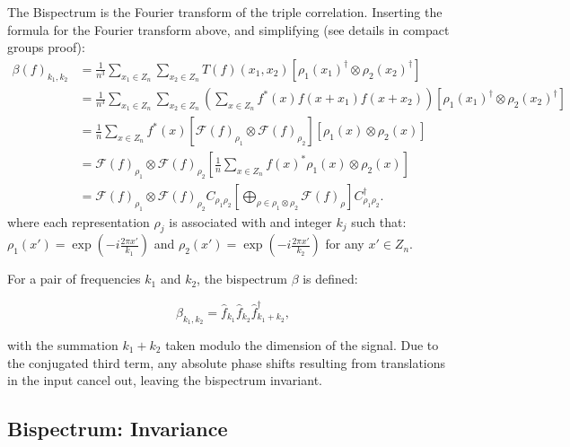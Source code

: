 \documentclass{article}
\begin{document}
The Bispectrum is the Fourier transform of the triple correlation. Inserting the formula for the Fourier transform above, and simplifying (see details in compact groups proof):
\begin{align*}
    \beta(f)_{k_1, k_2}
        &=
    \frac{1}{n^3}\sum_{x_1 \in Z_n} \sum_{x_2 \in Z_n}
    T(f)(x_1, x_2)\left[
                \rho_1(x_1)^{\dagger} \otimes \rho_2(x_2)^{\dagger}
            \right]\\
    &=
    \frac{1}{n^3}\sum_{x_1 \in Z_n} \sum_{x_2 \in Z_n}
    \left(\sum_{x \in Z_n}
       f^*(x)
       f\left(x + x_1\right) f\left(x+ x_2\right)\right)
            \left[
                \rho_1(x_1)^{\dagger} \otimes \rho_2(x_2)^{\dagger}
            \right]\\
    &= \frac{1}{n}
        \sum_{x \in Z_n} f^*(x)
            [\mathcal{F}(f)_{\rho_1} \otimes \mathcal{F}(f)_{\rho_2}]
            \left[
                \rho_1(x) \otimes \rho_2(x)
            \right]\\
    &= \mathcal{F}(f)_{\rho_1} \otimes \mathcal{F}(f)_{\rho_2}
        \left[
            \frac{1}{n}
                \sum_{x \in Z_n} f(x)^* \rho_1(x) \otimes \rho_2(x)
        \right] \\
    &=
\mathcal{F}(f)_{\rho_1} \otimes \mathcal{F}(f)_{\rho_2} C_{{\rho_1} {\rho_2}}
    \left[
    \bigoplus_{\rho \in \rho_1 \otimes \rho_2}
        \mathcal{F}(f)_\rho
    \right] C_{{\rho_1} {\rho_2}}^{\dagger} .
\end{align*}
where each representation $\rho_j$ is associated with and integer $k_j$ such that: $\rho_1(x') = \exp(-i\frac{2\pi x'}{k_1})$ and $\rho_2(x') = \exp(-i\frac{2\pi x'}{k_2})$ for any $x' \in Z_n$.


For a pair of frequencies $k_1$ and $k_2$, the bispectrum $\beta$ is defined:

\begin{equation}
\beta_{k_1, k_2} = \hat{f}_{k_1}\hat{f}_{k_2}\hat{f}^{\dagger}_{k_1+k_2},
\end{equation}

with the summation $k_1+k_2$ taken modulo the dimension of the signal. Due to the conjugated third term, any absolute phase shifts resulting from translations in the input cancel out, leaving the bispectrum invariant.

\subsection{Bispectrum: Invariance}
\end{document}
